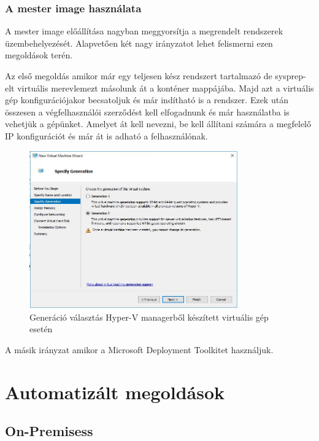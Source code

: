 \documentclass[12pt,oneside,justify]{book}
\begin{document}
\subsubsection{A mester image használata}

A mester image előállítása nagyban meggyorsítja a megrendelt rendszerek üzembehelyezését. Alapvetően két nagy irányzatot lehet felismerni ezen megoldások terén. 

Az első megoldás amikor már egy teljesen kész rendszert tartalmazó de sysprep-elt virtuális merevlemezt másolunk át a konténer mappájába. Majd azt a virtuális gép konfigurációjakor becsatoljuk és már indítható is a rendszer. Ezek után összesen a végfelhasználói szerződést kell elfogadnunk és már használatba is vehetjük a gépünket. Amelyet át kell nevezni, be kell állítani számára a megfelelő IP konfigurációt és már át is adható a felhasználónak. 

 
\begin{figure}[h]
\centering
\includegraphics[width=0.8\textwidth]{generation_selection}
\caption{Generáció választás Hyper-V managerből készített virtuális gép esetén}
\label{fig:gen_selection}
\end{figure}


A másik irányzat amikor a Microsoft Deployment Toolkitet használjuk.

\section{Automatizált megoldások}


\subsection{On-Premisess}
\end{document}
